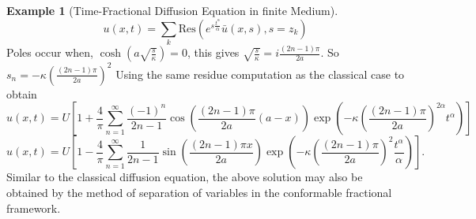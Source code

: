 \documentclass[two side,reqno,12pt]{amsart}
\numberwithin{equation}{section}
\theoremstyle{definition}
\newtheorem{example}[lemma]{Example}
\begin{document}
\begin{example}[Time-Fractional Diffusion Equation in finite Medium]
\[
   u(x,t) = \sum_k \text{Res}\left(e^{s\frac{t^\alpha}{\alpha}} \bar{u}(x,s), s = z_k\right) 
\]
Poles occur when,
\(
\cosh\left(a \sqrt{\frac{s}{\kappa}}\right) = 0
\), this gives
\(
\sqrt{\frac{s}{\kappa}} = i \frac{(2n-1)\pi}{2a}
\).
So
\(
s_n = -\kappa \left(\frac{(2n-1)\pi}{2a}\right)^2
\)
Using the same residue computation as the classical case to obtain
\[
    u(x,t) = U \left[ 1 + \frac{4}{\pi} \sum_{n=1}^{\infty} \frac{(-1)^n}{2n-1} \cos\left( \frac{(2n-1)\pi}{2a}(a-x) \right) \exp\left( -\kappa \left( \frac{(2n-1)\pi}{2a} \right)^{2\alpha} t^\alpha \right) \right]
\]
\[
    u(x,t) = U \left[ 1 - \frac{4}{\pi} \sum_{n=1}^{\infty} \frac{1}{2n-1} \sin\left(\frac{(2n-1)\pi x}{2a}\right) \exp\left(-\kappa \left(\frac{(2n-1)\pi}{2a}\right)^2 \frac{t^{\alpha}}{\alpha}\right) \right].   
\]
Similar to the classical diffusion equation, the above solution may also be obtained by the method of separation of variables in the conformable fractional framework.
\end{example}
\end{document}

